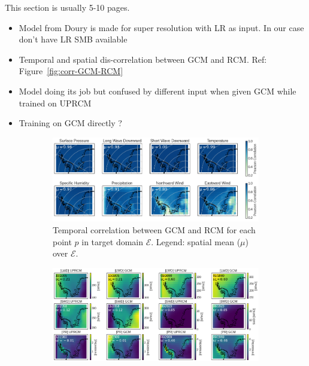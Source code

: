 \documentclass[a4paper,11pt,oneside]{report}
\begin{document}
This section is usually 5-10 pages.

\begin{itemize}
    \item Model from Doury is made for super resolution with LR as input. In our case don't have LR SMB available
    \item Temporal and spatial dis-correlation between GCM and RCM. Ref: Figure~\ref{fig:corr-GCM-RCM}
    \item Model doing its job but confused by different input when given GCM while trained on UPRCM
    \item Training on GCM directly ?
\end{itemize}


\begin{figure}[tbp]
        \centering
        \begin{subfigure}[b]{\columnwidth}
            \centering \includegraphics[width=\textwidth]{doc/Thesis-latex/images/results/temporalCorr_RCM_GCM.png}
            \caption[]%
            {{\small Temporal correlation between GCM and RCM for each point $p$ in target domain $\mathcal{E}$. Legend: spatial mean ($\mu$) over $\mathcal{E}$}.}    
          \label{fig:temp-corr-GCM-UPRCM}
        \end{subfigure}
        \hfill
        \begin{subfigure}[b]{\columnwidth}  
            \centering 
            \includegraphics[width=\textwidth]{doc/Thesis-latex/images/results/spatialCorr_RCM_GCM.png}

\end{subfigure}
\end{figure}
\end{document}
